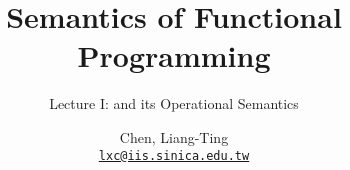 \title{Semantics of Functional Programming}
\subtitle{Lecture I: \PCF{} and its Operational Semantics}
\author[L.-T. Chen]{Chen, Liang-Ting\\
  \href{mailto:lxc@iis.sinica.edu.tw}{\texttt{lxc@iis.sinica.edu.tw}}}


\setcounter{framenumber}{-1}

\frame{\maketitle}
%
%


